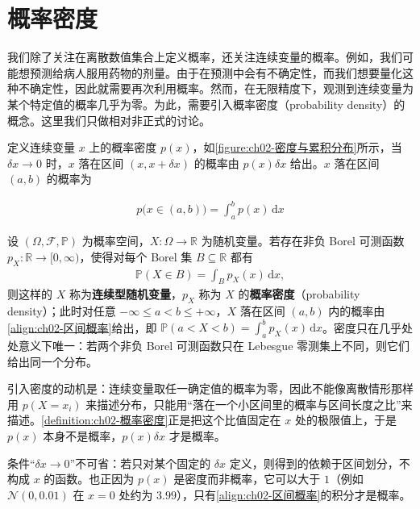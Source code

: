 \documentclass[../../main.tex]{subfiles}
\begin{document}
\section{概率密度}\label{section:ch02-概率密度}

我们除了关注在离散数值集合上定义概率，还关注连续变量的概率。例如，我们可能想预测给病人服用药物的剂量。由于在预测中会有不确定性，而我们想要量化这种不确定性，因此就需要再次利用概率。然而，在无限精度下，观测到连续变量为某个特定值的概率几乎为零。为此，需要引入概率密度（probability density）的概念。这里我们只做相对非正式的讨论。

定义连续变量 $x$ 上的概率密度 $p(x)$，如\cref{figure:ch02-密度与累积分布}所示，当 $\delta x\to0$ 时，$x$ 落在区间 $(x,x+\delta x)$ 的概率由 $p(x)\delta x$ 给出。$x$ 落在区间 $(a,b)$ 的概率为

\begin{align}
  p\big(x\in(a,b)\big) = \int_{a}^{b} p(x)\,\mathrm{d}x
  \label{align:ch02-区间概率}
\end{align}

\begin{definition}[概率密度]\label{definition:ch02-概率密度}
设 $(\Omega,\mathcal{F},\mathbb{P})$ 为概率空间，$X:\Omega\to\mathbb{R}$ 为随机变量。若存在非负 Borel 可测函数 $p_X:\mathbb{R}\to[0,\infty)$，使得对每个 Borel 集 $B\subseteq\mathbb{R}$ 都有
\begin{align*}
  \mathbb{P}(X\in B)=\int_B p_X(x)\,\mathrm{d}x,
\end{align*}
则这样的 $X$ 称为\textbf{连续型随机变量}，$p_X$ 称为 $X$ 的\textbf{概率密度}（probability density）；此时对任意 $-\infty\leqslant a<b\leqslant+\infty$，$X$ 落在区间 $(a,b)$ 内的概率由\eqref{align:ch02-区间概率}给出，即 $\mathbb{P}(a<X<b)=\int_a^b p_X(x)\,\mathrm{d}x$。密度只在几乎处处意义下唯一：若两个非负 Borel 可测函数只在 Lebesgue 零测集上不同，则它们给出同一个分布。
\end{definition}

\begin{remark}
引入密度的动机是：连续变量取任一确定值的概率为零，因此不能像离散情形那样用 $p(X=x_i)$ 来描述分布，只能用“落在一个小区间里的概率与区间长度之比”来描述。\cref{definition:ch02-概率密度}正是把这个比值固定在 $x$ 处的极限值上，于是 $p(x)$ 本身不是概率，$p(x)\delta x$ 才是概率。

条件“$\delta x\to0$”不可省：若只对某个固定的 $\delta x$ 定义，则得到的依赖于区间划分，不构成 $x$ 的函数。也正因为 $p(x)$ 是密度而非概率，它可以大于 $1$（例如 $\mathcal{N}(0,0.01)$ 在 $x=0$ 处约为 $3.99$），只有\eqref{align:ch02-区间概率}的积分才是概率。
\end{remark}
\end{document}
